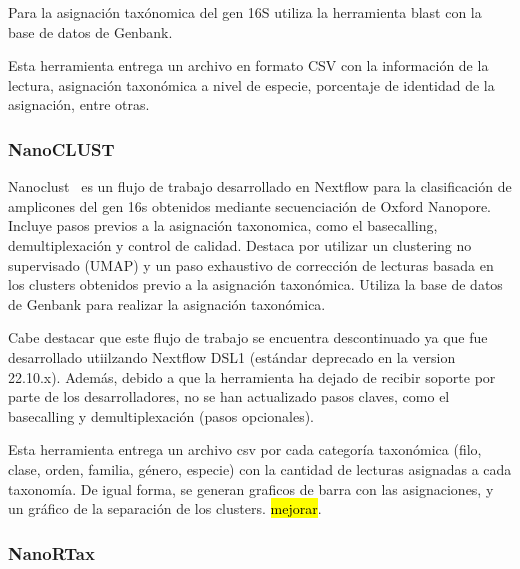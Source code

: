 Para la asignación taxónomica del gen 16S utiliza la herramienta blast con la base de datos de Genbank.

Esta herramienta entrega un archivo en formato CSV con la información de la lectura, asignación taxonómica a nivel de especie, porcentaje de identidad de la asignación, entre otras.
\subsubsection{NanoCLUST}
Nanoclust~\cite{10.1093/bioinformatics/btaa900} es un flujo de trabajo desarrollado en Nextflow para la clasificación de amplicones del gen 16s obtenidos mediante secuenciación de Oxford Nanopore. Incluye pasos previos a la asignación taxonomica, como el basecalling, demultiplexación y control de calidad. Destaca por utilizar un clustering no supervisado (UMAP) y un paso exhaustivo de corrección de lecturas basada en los clusters obtenidos previo a la asignación taxonómica.
Utiliza la base de datos de Genbank para realizar la asignación taxonómica.

Cabe destacar que este flujo de trabajo se encuentra descontinuado ya que fue desarrollado utiilzando Nextflow DSL1 (estándar deprecado en la version 22.10.x). Además, debido a que la herramienta ha dejado de recibir soporte por parte de los desarrolladores, no se han actualizado pasos claves, como el basecalling y demultiplexación (pasos opcionales).

Esta herramienta entrega un archivo csv por cada categoría taxonómica (filo, clase, orden, familia, género, especie) con la cantidad de lecturas asignadas a cada taxonomía. De igual forma, se generan graficos de barra con las asignaciones, y un gráfico de la separación de los clusters. \hl{mejorar}. 
\subsubsection{NanoRTax}


